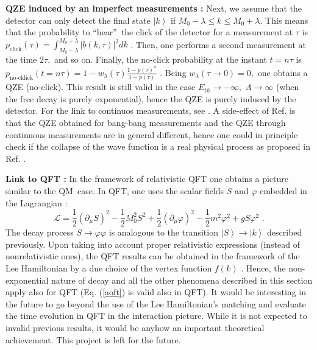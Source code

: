 \documentclass[12pt]{article}%
\begin{document}
\textbf{QZE induced by an imperfect measurements \cite{gplast}: }Next, we
assume that the detector can only detect the final state $\left\vert
k\right\rangle $ if $M_{0}-\lambda\leq k\leq M_{0}+\lambda.$ This means that
the probability to \textquotedblleft hear\textquotedblright\ the click of the
detector for a measurement at $\tau$ is $p_{\text{click}}(\tau)=\int
_{M_{0}-\lambda}^{M_{0}+\lambda}\left\vert b(k,\tau)\right\vert ^{2}dk$ .
Then, one performs a second measurement at the time $2\tau,$ and so on.
Finally, the no-click probability at the instant $t=n\tau$ is
$p_{\text{no-cklick}}(t=n\tau)=1-w_{\lambda}(\tau)\frac{1-p(\tau)^{n}%
}{1-p(\tau)}$ \cite{proccreta}. Being $w_{\lambda}(\tau\rightarrow0)=0,$ one
obtains a QZE (no-click). This result is still valid in the case
$E_{th}\rightarrow-\infty,$ $\Lambda\rightarrow\infty$ (when the free decay is
purely exponential), hence the QZE is purely induced by the detector. For the
link to continuos measurements, see \cite{shimizu,pascapulsed}. A side-effect
of Ref. \cite{gplast} is that the QZE obtained for bang-bang measurements and
the QZE through continuous measurements are in general different, hence one
could in principle check if the collapse of the wave function is a real
physical process as proposed in Ref. \cite{bassi}.

\textbf{Link to QFT \cite{zenoqft}: }In the framework of relativistic QFT one
obtains a picture similar to the QM\ case. In QFT, one uses the scalar fields
$S$ and $\varphi$ embedded in the Lagrangian \cite{zenoqft,duecan,lupo}:%
\begin{equation}
\mathcal{L}=\frac{1}{2}(\partial_{\mu}S)^{2}-\frac{1}{2}M_{0}^{2}S^{2}%
+\frac{1}{2}(\partial_{\mu}\varphi)^{2}-\frac{1}{2}m^{2}\varphi^{2}%
+gS\varphi^{2}\text{ .}%
\end{equation}
The decay process $S\rightarrow\varphi\varphi$ is analogous to the transition
$\left\vert S\right\rangle \rightarrow\left\vert k\right\rangle $ described
previously. Upon taking into account proper relativistic expressions (instead
of nonrelativistic ones), the QFT results can be obtained in the framework of
the Lee Hamiltonian by a due choice of the vertex function $f(k)$
\cite{duecan}. Hence, the non-exponential nature of decay and all the other
phenomena described in this section apply also for QFT (Eq. (\ref{aoft}) is
valid also in QFT). It would be interesting in the future to go beyond the use
of the Lee Hamiltonian's matching and evaluate the time evolution in QFT in
the interaction picture. While it is not expected to invalid previous results,
it would be anyhow an important theoretical achievement. This project is left
for the future.
\end{document}
